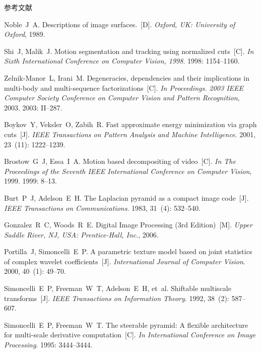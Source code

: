 \documentclass[xcolor=svgnames,serif,table]{beamer}
\begin{document}
\begin{frame}[allowframebreaks]{参考文献}
\begin{thebibliography}{10}
{\beamertemplatebookbibitems
{}
Noble~J~A.
\newblock Descriptions of image surfaces.~[D].
\newblock \emph{Oxford, UK: University of Oxford}, 1989.}

Shi~J, Malik~J.
\newblock Motion segmentation and tracking using normalized cuts~[C].
\newblock \emph{In Sixth International Conference on Computer Vision, 1998}.
1998:  1154--1160.

Zelnik-Manor~L, Irani~M.
\newblock Degeneracies, dependencies and their implications in multi-body and
  multi-sequence factorizations~[C].
\newblock \emph{In Proceedings. 2003 IEEE Computer Society Conference on Computer Vision and
  Pattern Recognition}, 2003.
2003:  II--287.

Boykov~Y, Veksler~O, Zabih~R.
\newblock Fast approximate energy minimization via graph cuts~[J].
\newblock \emph{IEEE Transactions on Pattern Analysis and Machine Intelligence}.
2001, 23~(11):  1222--1239.

Brostow~G~J, Essa~I~A.
\newblock Motion based decompositing of video~[C].
\newblock \emph{In The Proceedings of the Seventh IEEE International Conference on Computer
  Vision}, 1999.
1999:  8--13.

Burt~P~J, Adelson~E~H.
\newblock The Laplacian pyramid as a compact image code~[J].
\newblock \emph{IEEE Transactions on Communications}.
1983, 31~(4):  532--540.

{\beamertemplatebookbibitems
{}
Gonzalez~R~C, Woods~R~E.
\newblock Digital Image Processing (3rd Edition)~[M].
\newblock \emph{Upper Saddle River, NJ, USA: Prentice-Hall, Inc}., 2006.}

Portilla~J, Simoncelli~E~P.
\newblock A parametric texture model based on joint statistics of complex wavelet
  coefficients~[J].
\newblock \emph{International Journal of Computer Vision}.
2000, 40~(1):  49--70.

Simoncelli~E~P, Freeman~W~T, Adelson~E~H, et~al.
\newblock Shiftable multiscale transforms~[J].
\newblock \emph{IEEE Transactions on Information Theory}.
1992, 38~(2):  587--607.

Simoncelli~E~P, Freeman~W~T.
\newblock The steerable pyramid: A flexible architecture for multi-scale derivative
  computation~[C].
\newblock \emph{In International Conference on Image Processing}.
1995:  3444--3444.


\end{thebibliography}
\end{frame}
\end{document}
